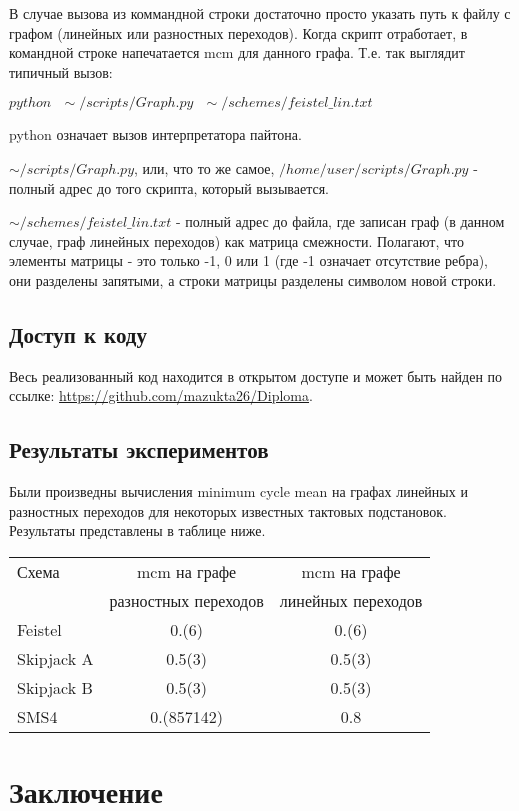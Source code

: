 \documentclass[a4paper,12pt]{extarticle}
\theoremstyle{plain} %
\begin{document}
\begin{large}
В случае вызова из коммандной строки достаточно просто указать путь к файлу с графом (линейных или разностных переходов). Когда скрипт отработает, в командной строке напечатается mcm для данного графа. Т.е. так выглядит типичный вызов:

$python ~~~\sim/scripts/Graph.py~~~ \sim/schemes/feistel\_lin.txt$

python означает вызов интерпретатора пайтона.

$\sim/scripts/Graph.py$, или, что то же самое, $/home/user/scripts/Graph.py$ - полный адрес до того скрипта, который вызывается.

$\sim/schemes/feistel\_lin.txt$ - полный адрес до файла, где записан граф (в данном случае, граф линейных переходов) как матрица смежности. Полагают, что элементы матрицы - это только -1, 0 или 1 (где -1 означает отсутствие ребра), они разделены запятыми, а строки матрицы разделены символом новой строки.

\subsection{Доступ к коду}

Весь реализованный код находится в открытом доступе и может быть найден по ссылке: \url{https://github.com/mazukta26/Diploma}.

\subsection{Результаты экспериментов}

Были произведны вычисления minimum cycle mean на графах линейных и разностных переходов для некоторых известных тактовых подстановок. Результаты представлены в таблице ниже.
\newline

\begin{tabular}{ l | c | c }
  \hline			
  Схема & mcm на графе & mcm на графе \\
   & разностных переходов & линейных переходов \\
\hline
  Feistel & 0.(6) & 0.(6) \\
  Skipjack A & 0.5(3) & 0.5(3) \\
  Skipjack B & 0.5(3) & 0.5(3) \\
  SMS4 & 0.(857142) & 0.8 \\
  \hline  
\end{tabular}

\newpage
\section*{Заключение}
\vspace*{1cm}


\end{large}
\end{document}
